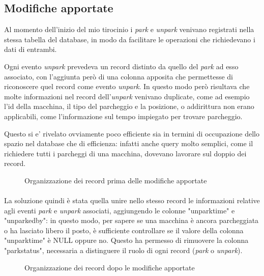 \documentclass[italian, oneside]{sapthesis} %
\begin{document}
		\subsection{Modifiche apportate}
		Al momento dell'inizio del mio tirocinio i \textit{park} e \textit{unpark} venivano registrati nella stessa tabella del database, in modo da facilitare le operazioni che richiedevano i dati di entrambi. 
		
		Ogni evento \textit{unpark} prevedeva un record distinto da quello del \textit{park} ad esso associato, con l'aggiunta per\`o di una colonna apposita che permettesse di riconoscere quel record come evento \textit{unpark}. In questo modo per\`o risultava che molte informazioni nel record dell'\textit{unpark} venivano duplicate, come ad esempio l'id della macchina, il tipo del parcheggio e la posizione, o addirittura non erano applicabili, come l'informazione sul tempo impiegato per trovare parcheggio.

		Questo si e' rivelato ovviamente poco efficiente sia in termini di occupazione dello spazio nel database che di efficienza: infatti anche query molto semplici, come il richiedere tutti i parcheggi di una macchina, dovevano lavorare sul doppio dei record.
		
		\begin{figure}[h]
			\caption{Organizzazione dei record prima delle modifiche apportate}
			\label{fig:1}
		  \end{figure}

		\paragraph*{}
		La soluzione quindi \`e stata quella unire nello stesso record le informazioni relative agli eventi \textit{park} e \textit{unpark} associati, aggiungendo le colonne "unparktime" e "unparkedby": in questo modo, per sapere se una macchina \`e ancora parcheggiata o ha lasciato libero il posto, \`e sufficiente controllare se il valore della colonna "unparktime" \`e NULL oppure no. Questo ha permesso di rimuovere la colonna "parkstatus", necessaria a distinguere il ruolo di ogni record (\textit{park} o \textit{unpark}).

		\begin{figure}[h]
			\caption{Organizzazione dei record dopo le modifiche apportate}
			\label{fig:2}
		\end{figure}
\end{document}
